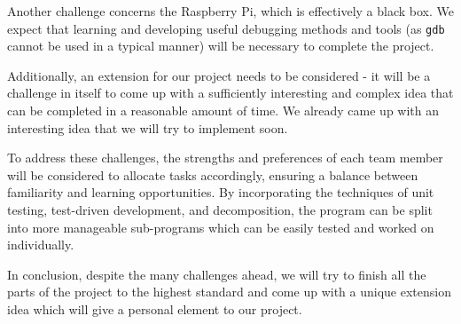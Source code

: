 \documentclass[11pt, oneside, USenglish]{article}
\begin{document}
Another challenge concerns the Raspberry Pi, which is effectively a black box.
We expect that learning and developing useful debugging methods and tools (as \verb|gdb| cannot be used in a typical manner) will be necessary to complete the project.

Additionally, an extension for our project needs to be considered - it will be a challenge in itself to come up with a sufficiently interesting and complex idea that can be completed in a reasonable amount of time. We already came up with an interesting idea that we will try to implement soon.

To address these challenges, the strengths and preferences of each team member will be considered to allocate tasks accordingly, ensuring a balance between familiarity and learning opportunities.
By incorporating the techniques of unit testing, test-driven development, and decomposition, the program can be split into more manageable sub-programs which can be easily tested and worked on individually.

In conclusion, despite the many challenges ahead, we will try to finish all the parts of the project to the highest standard and come up with a unique extension idea which will give a personal element to our project.
\end{document}
